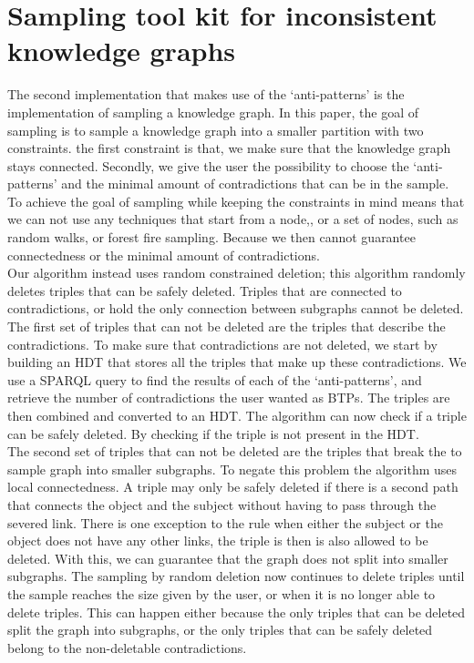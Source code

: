\documentclass[11pt,letterpaper ,oneside ]{book}
\begin{document}
\section{Sampling tool kit for inconsistent knowledge graphs}
The second implementation that makes use of the `anti-patterns' is the implementation of sampling a knowledge graph. In this paper, the goal of sampling is to sample a knowledge graph into a smaller partition with two constraints. the first constraint is that, we make sure that the knowledge graph stays connected. Secondly, we give the user the possibility to choose the `anti-patterns' and the minimal amount of contradictions that can be in the sample.
To achieve the goal of sampling while keeping the constraints in mind means that we can not use any techniques that start from a node,, or a set of nodes, such as random walks, or forest fire sampling. Because we then cannot guarantee connectedness or the minimal amount of contradictions.\\ 
Our algorithm instead uses random constrained deletion; this algorithm randomly deletes triples that can be safely deleted. Triples that are connected to contradictions, or hold the only connection between subgraphs cannot be deleted.
The first set of triples that can not be deleted are the triples that describe the contradictions. To make sure that contradictions are not deleted, we start by building an HDT\cite{FMPGPA:13}\cite{MPAF:12} that stores all the triples that make up these contradictions. We use a SPARQL query to find the results of each of the `anti-patterns', and retrieve the number of contradictions the user wanted as BTPs. The triples are then combined and converted to an HDT. The algorithm can now check if a triple can be safely deleted. By checking if the triple is not present in the HDT.\\
The second set of triples that can not be deleted are the triples that break the to sample graph into smaller subgraphs. To negate this problem the algorithm uses local connectedness. A triple may only be safely deleted if there is a second path that connects the object and the subject without having to pass through the severed link. There is one exception to the rule when either the subject or the object does not have any other links, the triple is then is also allowed to be deleted. With this, we can guarantee that the graph does not split into smaller subgraphs. 
The sampling by random deletion now continues to delete triples until the sample reaches the size given by the user, or when it is no longer able to delete triples. This can happen either because the only triples that can be deleted split the graph into subgraphs, or the only triples that can be safely deleted belong to the non-deletable contradictions.
\end{document}

